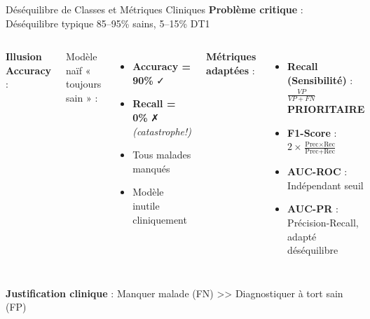 \documentclass[11pt, aspectratio=169]{beamer}
\begin{document}
\begin{frame}{Déséquilibre de Classes et Métriques Cliniques}
  \textbf{\textcolor{accent1}{Problème critique}} : Déséquilibre typique 85--95\% sains, 5--15\% DT1
  
  \vspace{0.6em}
  
  \begin{columns}[T]
    \textbf{\color{accent1} Illusion Accuracy} :
    
    Modèle naïf « toujours sain » :
    
    \begin{itemize}
      \item \textbf{Accuracy = 90\%} ✓
      \item \textbf{Recall = 0\%} ✗ \textit{(catastrophe!)}
      \item Tous malades manqués
      \item Modèle inutile cliniquement
    \end{itemize}
    
    \textbf{\color{accent2} Métriques adaptées} :
    \begin{itemize}
      \item \textbf{Recall (Sensibilité)} : $\frac{VP}{VP + FN}$ \textbf{PRIORITAIRE}
      \item \textbf{F1-Score} : $2 \times \frac{\text{Prec} \times \text{Rec}}{\text{Prec} + \text{Rec}}$
      \item \textbf{AUC-ROC} : Indépendant seuil
      \item \textbf{AUC-PR} : Précision-Recall, adapté déséquilibre
    \end{itemize}
  \end{columns}
  
  \vspace{1em}
  
  \textbf{Justification clinique} : Manquer malade (FN) >> Diagnostiquer à tort sain (FP)
\end{frame}
\end{document}
